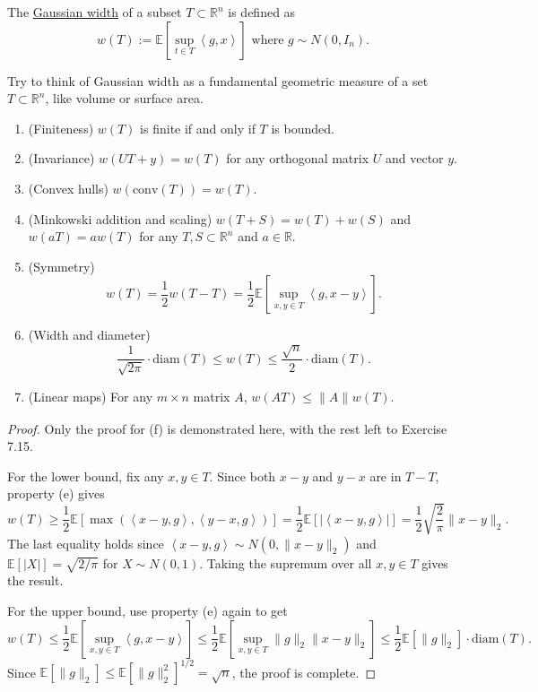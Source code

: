 \begin{definition}[]
\label{def:7.5.1}
The \underline{Gaussian width} of a subset $T \subset \mathbb{R}^n$ is defined as 
\[ w(T) := \mathbb{E}\left[ \sup_{t \in T}\left\langle g, x \right\rangle \right] \text{ where } 
g \sim N(0, I_n). \]
\end{definition}

Try to think of Gaussian width as a fundamental geometric measure of a set $T \subset \mathbb{R}^n$, like 
volume or surface area.

\begin{proposition}
\label{prop:7.5.2}
\begin{enumerate}
	\item (Finiteness) $w(T)$ is finite if and only if $T$ is bounded.
	\item (Invariance) $w(UT + y) = w(T)$ for any orthogonal matrix $U$ and vector $y$.
	\item (Convex hulls) $w(\mathrm{conv}(T)) = w(T)$.
	\item (Minkowski addition and scaling) $w(T + S) = w(T) + w(S)$ and $w(aT) = aw(T)$ for any $T, S \subset 
	\mathbb{R}^n$ and $a \in \mathbb{R}$.
	\item (Symmetry) 
	\[ w(T) = \frac{1}{2}w(T - T) = \frac{1}{2}\mathbb{E}\left[ \sup_{x, y \in T} 
	\left\langle g, x - y \right\rangle \right]. \]
	\item (Width and diameter) 
	\[ \frac{1}{\sqrt{2 \pi}} \cdot \mathrm{diam}(T) \leq w(T) \leq \frac{\sqrt{n}}{2} \cdot \mathrm{diam}(T). \]
	\item (Linear maps) For any $m \times n$ matrix $A$, $w(AT) \leq \lVert A \rVert_{} w(T)$.
\end{enumerate}
\end{proposition}

\begin{proof}
Only the proof for (f) is demonstrated here, with the rest left to Exercise 7.15.

For the lower bound, fix any $x, y \in T$. Since both $x - y$ and $y - x$ are in $T - T$, property (e) gives 
\[ w(T) \geq \frac{1}{2}\mathbb{E}\left[ \max_{}(\left\langle x - y, g \right\rangle, 
\left\langle y - x, g \right\rangle) \right] = \frac{1}{2}\mathbb{E}\left[ 
|\left\langle x - y, g \right\rangle| \right] = \frac{1}{2} \sqrt{\frac{2}{\pi}} \lVert x - y \rVert_{2}. \]
The last equality holds since $\left\langle x - y, g \right\rangle \sim N(0, \lVert x - y \rVert_{2})$ and 
$\mathbb{E}\left[ |X| \right] = \sqrt{2 / \pi}$ for $X \sim N(0, 1)$. Taking the supremum over all $x, y \in T$ 
gives the result.

For the upper bound, use property (e) again to get 
\[ w(T) \leq \frac{1}{2}\mathbb{E}\left[ \sup_{x, y \in T} \left\langle g, x - y \right\rangle \right] 
\leq \frac{1}{2}\mathbb{E}\left[ \sup_{x, y \in T} \lVert g \rVert_{2} \lVert x - y \rVert_{2} \right] 
\leq \frac{1}{2}\mathbb{E}\left[ \lVert g \rVert_{2} \right] \cdot \mathrm{diam}(T). \]
Since $\mathbb{E}\left[ \lVert g \rVert_{2} \right] \leq \mathbb{E}\left[ \lVert g \rVert_{2}^2 \right]^{1/2} 
= \sqrt{n}$, the proof is complete.
\end{proof}

